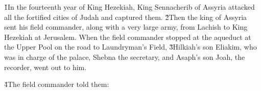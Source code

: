\v{1}In the fourteenth year of King Hezekiah, King Sennacherib of Assyria attacked all the fortified cities of Judah and captured them. \v{2}Then the king of Assyria sent his field commander, along with a very large army, from Lachish to King Hezekiah at Jerusalem. When the field commander stopped at the aqueduct at the Upper Pool on the road to Laundryman's Field, \v{3}Hilkiah's son Eliakim, who was in charge of the palace, Shebna the secretary, and Asaph's son Joah, the recorder, went out to him.

\v{4}The field commander told them:

